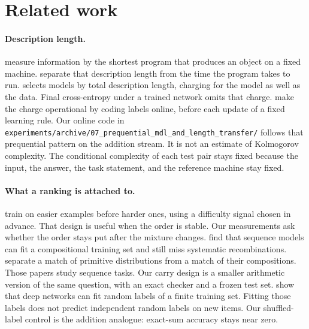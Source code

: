 \section{Related work}

\paragraph{Description length.}
\citet{kolmogorov1968three} measure information by the shortest program that produces an object on a fixed machine.
\citet{grunwald2008algorithmic} separate that description length from the time the program takes to run.
\citet{rissanen1978modeling} selects models by total description length, charging for the model as well as the data.
Final cross-entropy under a trained network omits that charge.
\citet{voita2020information} make the charge operational by coding labels online, before each update of a fixed learning rule.
Our online code in \texttt{experiments/archive/07\_prequential\_mdl\_and\_length\_transfer/} follows that prequential pattern on the addition stream.
It is not an estimate of Kolmogorov complexity.
The conditional complexity of each test pair stays fixed because the input, the answer, the task statement, and the reference machine stay fixed.

\paragraph{What a ranking is attached to.}
\citet{bengio2009curriculum} train on easier examples before harder ones, using a difficulty signal chosen in advance.
That design is useful when the order is stable.
Our measurements ask whether the order stays put after the mixture changes.
\citet{lake2018generalization} find that sequence models can fit a compositional training set and still miss systematic recombinations.
\citet{keysers2020measuring} separate a match of primitive distributions from a match of their compositions.
Those papers study sequence tasks.
Our carry design is a smaller arithmetic version of the same question, with an exact checker and a frozen test set.
\citet{zhang2017understanding} show that deep networks can fit random labels of a finite training set.
Fitting those labels does not predict independent random labels on new items.
Our shuffled-label control is the addition analogue: exact-sum accuracy stays near zero.

